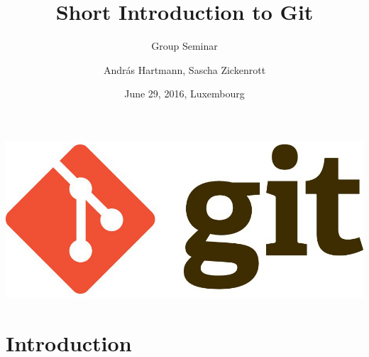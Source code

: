 \documentclass[10pt,xcolor=dvipsnames]{beamer}
\title{Short Introduction to Git}
\subtitle{Group Seminar}
\author{Andr\'as Hartmann, Sascha Zickenrott}
\institute[LCSB]{
LCSB, Computational Biology group
  University of Luxembourg
}
\date[June 29, 2016]{June 29, 2016, Luxembourg}
\begin{document}
\begin{frame}
  \vspace{2.5em}
\begin{center}
    \includegraphics[height=0.2\textheight]{git-logo.jpg}
\end{center}
  \titlepage
\end{frame}


\section{Introduction}
\end{document}
